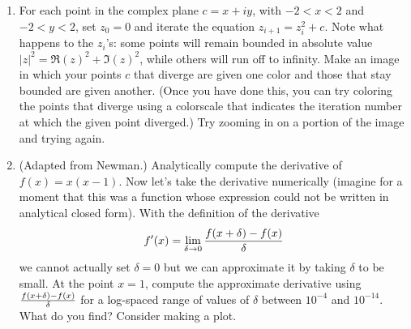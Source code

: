 \documentclass[]{article}
\begin{document}
\begin{enumerate}
\item 
For each point in the complex plane $c = x + iy$, with $-2 < x < 2$ and $-2 < y < 2$, set $z_0 = 0$ and iterate the equation $z_{i + 1} = z_i^2 + c$.  Note what happens to the $z_i$'s: some points will remain bounded in absolute value $|z|^2 = \Re(z)^2 + \Im(z)^2$, while others will run off to infinity.  Make an image  in which your points $c$ that diverge are given one color and those that stay bounded are given another.  (Once you have done this, you can try coloring the points that diverge using a colorscale that indicates the iteration number at which the given point diverged.)  Try zooming in on a portion of the image and trying again.  

\item (Adapted from Newman.)  Analytically compute the derivative of $f(x) = x(x -1)$.  Now let's take the derivative numerically (imagine for a moment that this was a function whose expression could not be written in analytical closed form).  With the definition of the derivative 
\begin{equation} 
  f^\prime(x) = \lim_{\delta \to 0} {f(x + \delta) - f(x) \over \delta}
\end{equation} 
we cannot actually set $\delta = 0$ but we can approximate it by taking $\delta$ to be small.  At the point $x = 1$, compute the  approximate derivative using ${f(x + \delta) - f(x) \over \delta}$ for a log-spaced range of values of $\delta$ between $10^{-4}$ and $10^{-14}$.  What do you find?  Consider making a plot.

  

\end{enumerate}
\end{document}
